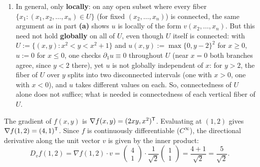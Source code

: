 \begin{exercisesolution}
\begin{enumerate}[label=\textbf{(\alph*)}]
\[    \]
  \item In general, only \textbf{locally}: on any open subset where every fiber
    $\{x_1 : (x_1,x_2,\dots,x_n) \in U\}$ (for fixed $(x_2,\dots,x_n)$) is connected, the same
    argument as in part \textbf{(a)} shows $u$ is locally of the form $v(x_2,\dots,x_n)$. But this
    need not hold \textbf{globally} on all of $U$, even though $U$ itself is connected: with
    $U := \{(x,y) : x^2 < y < x^2+1\}$ and $u(x,y) := \max\{0,y-2\}^2$ for $x \geq 0$, $u := 0$
    for $x \leq 0$, one checks $\partial_1 u \equiv 0$ throughout $U$ (near $x=0$ both branches
    agree, since $y < 2$ there), yet $u$ is not globally independent of $x$: for $y > 2$, the
    fiber of $U$ over $y$ splits into two disconnected intervals (one with $x>0$, one with
    $x<0$), and $u$ takes different values on each. So, connectedness of $U$ alone does not
    suffice; what is needed is connectedness of each vertical fiber of $U$.
\end{enumerate}
\end{exercisesolution}

\begin{exercisesolution}
\label{sol:ai_directional_derivative}
The gradient of $f(x,y)$ is $\nabla f(x,y) = (2xy, x^2)^{\mathsf{T}}$. Evaluating at $(1,2)$ gives $\nabla f(1,2) = (4,1)^{\mathsf{T}}$. Since $f$ is continuously differentiable ($C^\infty$), the directional derivative along the unit vector $v$ is given by the inner product:
\[
D_v f(1,2) = \nabla f(1,2) \cdot v = \begin{pmatrix} 4 \\ 1 \end{pmatrix} \cdot \frac{1}{\sqrt{2}}\begin{pmatrix} 1 \\ 1 \end{pmatrix} = \frac{4 + 1}{\sqrt{2}} = \frac{5}{\sqrt{2}}.
\]
\end{exercisesolution}


